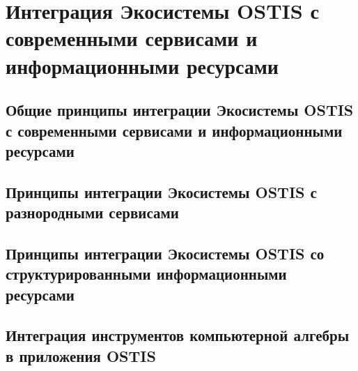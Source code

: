 \chapter{Интеграция Экосистемы OSTIS с современными сервисами и информационными ресурсами}
\label{chapter_integration}


\section{Общие принципы интеграции Экосистемы OSTIS с современными сервисами и информационными ресурсами}
\section{Принципы интеграции Экосистемы OSTIS с разнородными сервисами}
\section{Принципы интеграции Экосистемы OSTIS со структурированными информационными ресурсами}
\section{Интеграция инструментов компьютерной алгебры в приложения OSTIS}

%